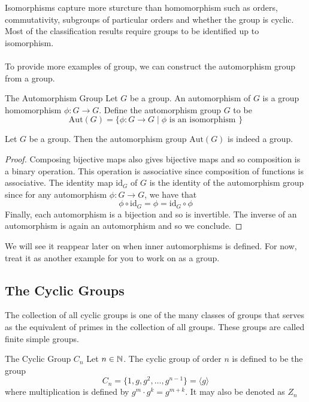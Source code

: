 \documentclass[a4paper]{article}
\begin{document}
Isomorphisms capture more sturcture than homomorphism such as orders, commutativity, subgroups of particular orders and whether the group is cyclic. Most of the classification results require groups to be identified up to isomorphism. \\~\\
To provide more examples of group, we can construct the automorphism group from a group. 

\begin{defn}{The Automorphism Group}{} Let $G$ be a group. An automorphism of $G$ is a group homomorphism $\phi:G\to G$. Define the automorphism group $G$ to be $$\text{Aut}(G)=\{\phi:G\to G\;|\;\phi\text{ is an isomorphism }\}$$
\end{defn}

\begin{lmm}{}{} Let $G$ be a group. Then the automorphism group $\text{Aut}(G)$ is indeed a group. \tcbline
\begin{proof}
Composing bijective maps also gives bijective maps and so composition is a binary operation. This operation is associative since composition of functions is associative. The identity map $\text{id}_G$ of $G$ is the identity of the automorphism group since for any automorphism $\phi:G\to G$, we have that $$\phi\circ\text{id}_G=\phi=\text{id}_G\circ\phi$$ Finally, each automorphism is a bijection and so is invertible. The inverse of an automorphism is again an automorphism and so we conclude. 
\end{proof}
\end{lmm}

We will see it reappear later on when inner automorphisms is defined. For now, treat it as another example for you to work on as a group. 

\subsection{The Cyclic Groups}
The collection of all cyclic groups is one of the many classes of groups that serves as the equivalent of primes in the collection of all groups. These groups are called finite simple groups. 

\begin{defn}{The Cyclic Group $C_n$}{} Let $n\in\mathbb{N}$. The cyclic group of order $n$ is defined to be the group $$C_n=\{1,g,g^2,\dots,g^{n-1}\}=\langle g\rangle$$ where multiplication is defined by $g^m\cdot g^k=g^{m+k}$. It may also be denoted as $Z_n$
\end{defn}
\end{document}
